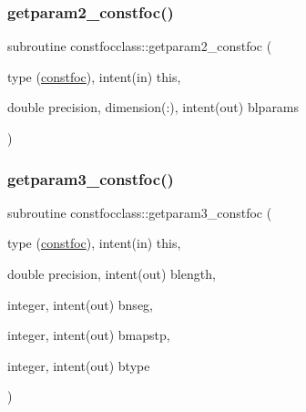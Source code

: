\mbox{\label{namespaceconstfocclass_a59ea6cb7198ad0bf8446abe6978a9069}} 
\subsubsection{\texorpdfstring{getparam2\_constfoc()}{getparam2\_constfoc()}}
{\footnotesize\ttfamily subroutine constfocclass\+::getparam2\+\_\+constfoc (\begin{DoxyParamCaption}\item[{type (\mbox{\hyperlink{namespaceconstfocclass_structconstfocclass_1_1constfoc}{constfoc}}), intent(in)}]{this,  }\item[{double precision, dimension(\+:), intent(out)}]{blparams }\end{DoxyParamCaption})}

\mbox{\label{namespaceconstfocclass_ae1fe9fc46cca742a797c388465086489}} 
\subsubsection{\texorpdfstring{getparam3\_constfoc()}{getparam3\_constfoc()}}
{\footnotesize\ttfamily subroutine constfocclass\+::getparam3\+\_\+constfoc (\begin{DoxyParamCaption}\item[{type (\mbox{\hyperlink{namespaceconstfocclass_structconstfocclass_1_1constfoc}{constfoc}}), intent(in)}]{this,  }\item[{double precision, intent(out)}]{blength,  }\item[{integer, intent(out)}]{bnseg,  }\item[{integer, intent(out)}]{bmapstp,  }\item[{integer, intent(out)}]{btype }\end{DoxyParamCaption})}

\mbox{\label{namespaceconstfocclass_a14001bee7b5f9c4138d8042dcc94955c}} 
